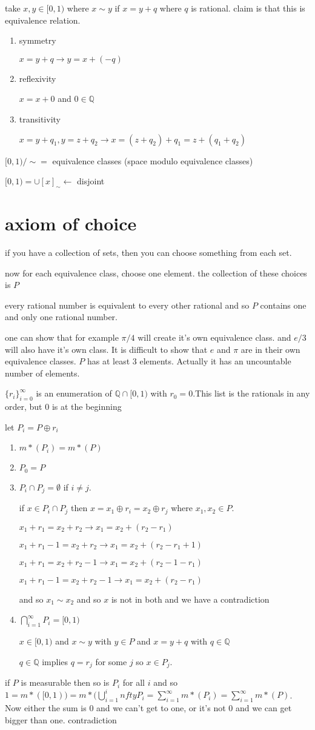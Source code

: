\documentclass[letterpaper]{article}
\begin{document}
take $x,y\in [0,1)$ where $x\sim y$ if $x=y+q$ where $q$ is rational. claim is that this is equivalence relation.
\begin{enumerate}
\item
symmetry

$x=y+q\to y=x+(-q)$
\item
reflexivity

$x=x+0$ and $0\in \mathbb{Q}$
\item
transitivity

$x=y+q_1, y=z+q_2\to x=(z+q_2)+q_1=z+(q_1+q_2)$
\end{enumerate}

$[0,1)/\sim=$ equivalence classes (space modulo equivalence classes)

$[0,1)=\cup[x]_\sim\leftarrow$ disjoint

\section*{axiom of choice}
if you have a collection of sets, then you can choose something from each set.

now for each equivalence class, choose one element. the collection of these choices is $P$

every rational number is equivalent to every other rational and so $P$ contains one and only one rational number.

one can show that for example $\pi/4$ will create it's own equivalence class. and $e/3$ will also have it's own class. It is difficult to show that $e$ and $\pi$ are in their own equivalence classes. $P$ has at least 3 elements. Actually it has an uncountable number of elements.

$\{r_i\}_{i=0}^\infty$ is an enumeration of $\mathbb{Q}\cap[0,1)$ with $r_0=0$.This list is the rationals in any order, but $0$ is at the beginning

let $P_i=P\oplus r_i$
\begin{enumerate}
\item
$m*(P_i)=m*(P)$
\item
$P_0=P$
\item
$P_i\cap P_j=\emptyset$ if $i\ne j$.

if $x\in P_i\cap P_j$ then $x=x_1\oplus r_i=x_2\oplus r_j$ where $x_1,x_2\in P$.

$x_1+r_1=x_2+r_2\to x_1=x_2 +(r_2-r_1)$

$x_1+r_1-1=x_2+r_2\to x_1=x_2+(r_2-r_1+1)$

$x_1+r_1=x_2+r_2-1\to x_1=x_2+(r_2-1-r_1)$

$x_1+r_1-1=x_2+r_2-1\to x_1=x_2+(r_2-r_1)$

and so $x_1\sim x_2$ and so $x$ is not in both and we have a contradiction
\item
$\bigcap_{i=1}^\infty P_i=[0,1)$

$x\in [0,1)$ and $x\sim y$ with $y\in P$ and $x=y+q$ with $q\in \mathbb{Q}$

$q\in \mathbb{Q}$ implies $q=r_j$ for some $j$ so $x\in P_j$.
\end{enumerate}

if $P$ is measurable then so is $P_i$ for all $i$ and so $1=m*([0,1))=m*(\bigcup_{i=1}^infty P_i=\sum\limits_{i=1}^\infty{m*(P_i)}=\sum\limits_{i=1}^\infty{m*(P)}$. Now either the sum is 0 and we can't get to one, or it's not 0 and we can get bigger than one. contradiction
\end{document}
